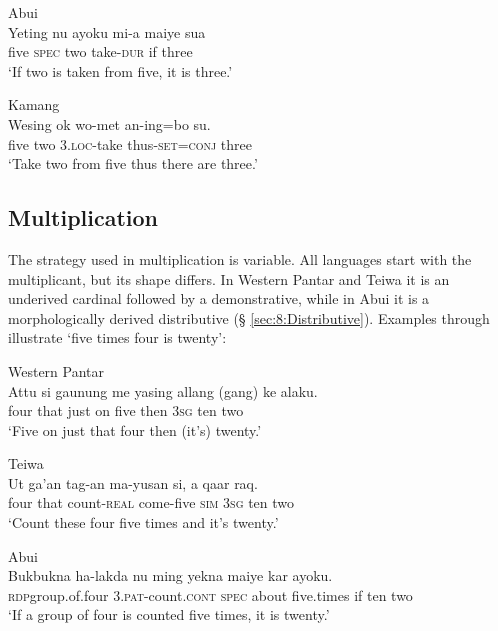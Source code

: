 \ea
\label{ex:8:1243}
{\upshape Abui}\\
 \gll Yeting  nu  ayoku  mi-a  maiye  sua\\
  five  \textsc{spec } two  take-\textsc{dur } if  three   \\
 \glt `If two is taken from five, it is three.' 
\z
 
  

\ea%
\label{bkm:Ref358115306}
  
{\upshape Kamang}\\
\gll  Wesing  ok  wo-met  an-ing=bo  su.   \\  
    five  two   3.\textsc{loc-}take  thus\textsc{{}-set}=\textsc{conj} three   \\
\glt `Take two from five thus there are three.' 
\z



 

 

\subsection{Multiplication}
\label{sec:8:Multiplication}
The strategy used in multiplication is variable. All languages start with the multiplicant, but its shape differs. In Western Pantar and Teiwa it is an underived cardinal followed by a demonstrative, while in Abui it is a morphologically derived distributive ({\S} \ref{sec:8:Distributive}). Examples  through   illustrate `five times four is twenty':


\ea%
\label{bkm:Ref358043144}
{\upshape Western Pantar}\\
\gll Attu  si  gaunung  me  yasing   allang  (gang)  ke alaku. \\  
   four  that  just  on  five  then  3\textsc{sg } ten two   \\
\glt `Five on just that four then (it's) twenty.'
\z


\ea
\label{ex:8:1244}
{\upshape Teiwa}\\ 
 \gll   Ut  ga'an  tag-an  ma-yusan  si,  a   qaar raq.  \\
    four  that   count-\textsc{real } come-five  \textsc{sim}  \textsc{3sg} ten two  \\
 \glt `Count these four five times and it's twenty.'
\z



\ea
\label{ex:8:1245}
{\upshape Abui}\\ 
 \gll Buk{\Tilde}bukna  ha-lakda  nu  ming  yekna  maiye  kar ayoku. \\
  \textsc{rdp}{\Tilde}group.of.four  \textsc{3.pat}-count.\textsc{cont}  \textsc{spec}  about  five.times  if  ten two  \\
 \glt  `If a group of four is counted five times, it is twenty.'
\z

